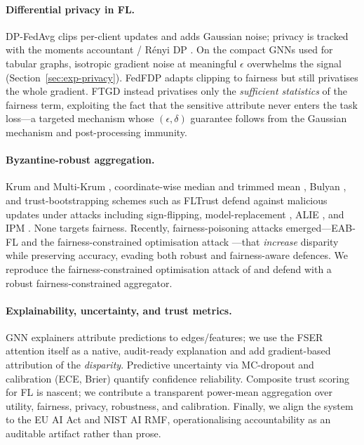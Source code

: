 \documentclass[pdflatex,sn-mathphys-num]{sn-jnl}
\theoremstyle{thmstyleone}%
\theoremstyle{thmstyletwo}%
\theoremstyle{thmstylethree}%
\begin{document}
\paragraph{Differential privacy in FL.}
DP-FedAvg \cite{mcmahan2018learning} clips per-client updates and adds Gaussian
noise; privacy is tracked with the moments accountant / R\'enyi DP
\cite{mironov2017renyi,abadi2016deep}. On the compact GNNs used for tabular
graphs, isotropic gradient noise at meaningful $\epsilon$ overwhelms the signal
(Section~\ref{sec:exp-privacy}). FedFDP \cite{ling2024feddp} adapts clipping to
fairness but still privatises the whole gradient. FTGD instead privatises only
the \emph{sufficient statistics} of the fairness term, exploiting the fact that
the sensitive attribute never enters the task loss---a targeted mechanism whose
$(\epsilon,\delta)$ guarantee follows from the Gaussian mechanism and
post-processing immunity.

\paragraph{Byzantine-robust aggregation.}
Krum and Multi-Krum \cite{blanchard2017krum}, coordinate-wise median and
trimmed mean \cite{yin2018byzantine}, Bulyan \cite{mhamdi2018hidden}, and
trust-bootstrapping schemes such as FLTrust \cite{cao2021fltrust} defend
against malicious updates under attacks including sign-flipping,
model-replacement \cite{bagdasaryan2020backdoor}, ALIE \cite{baruch2019little},
and IPM \cite{xie2019fall}. None targets fairness. Recently, fairness-poisoning
attacks emerged---EAB-FL \cite{eabfl2024} and the fairness-constrained
optimisation attack \cite{kasyap2025attack}---that \emph{increase} disparity
while preserving accuracy, evading both robust and fairness-aware defences. We
reproduce the fairness-constrained optimisation attack of
\cite{kasyap2025attack} and defend with a robust fairness-constrained
aggregator.

\paragraph{Explainability, uncertainty, and trust metrics.}
GNN explainers attribute predictions to edges/features; we use the FSER
attention itself as a native, audit-ready explanation and add gradient-based
attribution of the \emph{disparity}. Predictive uncertainty via MC-dropout
\cite{gal2016dropout} and calibration (ECE, Brier) quantify confidence
reliability. Composite trust scoring for FL is nascent; we contribute a
transparent power-mean aggregation over utility, fairness, privacy, robustness,
and calibration. Finally, we align the system to the EU AI Act and NIST AI RMF,
operationalising accountability as an auditable artifact rather than prose.
\end{document}
